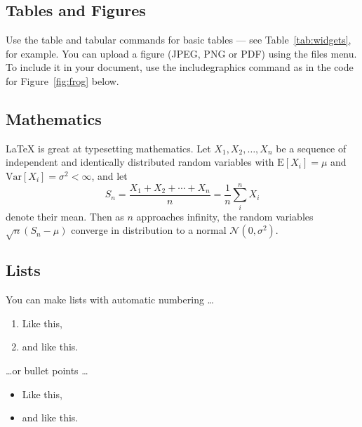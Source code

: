 
\subsection{Tables and Figures}

Use the table and tabular commands for basic tables --- see Table~\ref{tab:widgets}, for example. You can upload a figure (JPEG, PNG or PDF) using the files menu. To include it in your document, use the includegraphics command as in the code for Figure~\ref{fig:frog} below.



\subsection{Mathematics}

\LaTeX{} is great at typesetting mathematics. Let $X_1, X_2, \ldots, X_n$ be a sequence of independent and identically distributed random variables with $\text{E}[X_i] = \mu$ and $\text{Var}[X_i] = \sigma^2 < \infty$, and let
$$S_n = \frac{X_1 + X_2 + \cdots + X_n}{n}
      = \frac{1}{n}\sum_{i}^{n} X_i$$
denote their mean. Then as $n$ approaches infinity, the random variables $\sqrt{n}(S_n - \mu)$ converge in distribution to a normal $\mathcal{N}(0, \sigma^2)$.

\subsection{Lists}

You can make lists with automatic numbering \dots

\begin{enumerate}
\item Like this,
\item and like this.
\end{enumerate}
\dots or bullet points \dots
\begin{itemize}
\item Like this,
\item and like this.
\end{itemize}

